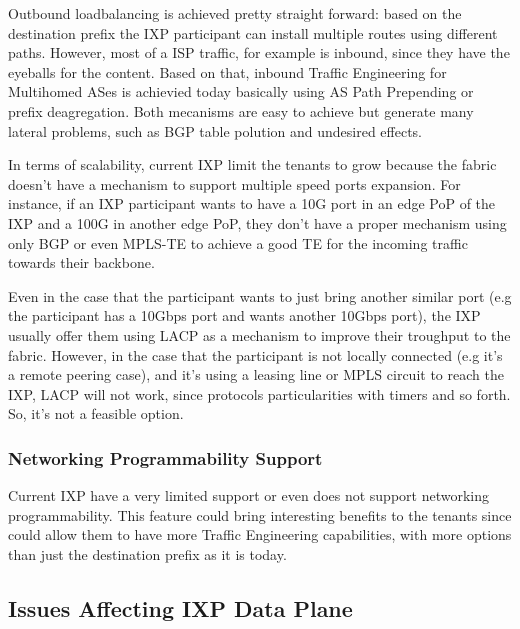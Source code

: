 \documentclass[conference]{IEEEtran/IEEEtran}
\begin{document}
Outbound loadbalancing is achieved pretty straight forward: based on the destination prefix the IXP participant can install multiple routes using different paths. However, most of a ISP traffic, for example is inbound, since they have the eyeballs for the content. Based on that, inbound Traffic Engineering for Multihomed ASes is achievied today basically using AS Path Prepending or prefix deagregation. Both mecanisms are easy to achieve but generate many lateral problems, such as BGP table polution and undesired effects.

In terms of scalability, current IXP limit the tenants to grow because the fabric doesn't have a mechanism to support multiple speed ports expansion. For instance, if an IXP participant wants to have a 10G port in an edge PoP of the IXP and a 100G in another edge PoP, they don't have a proper mechanism using only BGP or even MPLS-TE to achieve a good TE for the incoming traffic towards their backbone.

Even in the case that the participant wants to just bring another similar port (e.g the participant has a 10Gbps port and wants another 10Gbps port), the IXP usually offer them using LACP as a mechanism to improve their troughput to the fabric. However, in the case that the participant is not locally connected (e.g it's a remote peering case), and it's using a leasing line or MPLS circuit to reach the IXP, LACP will not work, since protocols particularities with timers and so forth. So, it's not a feasible option.


\subsubsection{Networking Programmability Support}
Current IXP have a very limited support or even does not support networking programmability. This feature could bring interesting benefits to the tenants since could allow them to have more Traffic Engineering capabilities, with more options than just the destination prefix as it is today. 

\subsection{Issues Affecting IXP Data Plane}
\end{document}
